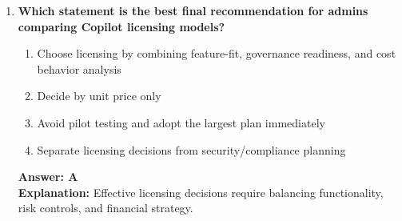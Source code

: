 \documentclass[10pt]{article}
\begin{document}
\begin{enumerate}[leftmargin=*]
\item \textbf{Which statement is the best final recommendation for admins comparing Copilot licensing models?}
\begin{enumerate}[label=\Alph*.]
  \item Choose licensing by combining feature-fit, governance readiness, and cost behavior analysis
  \item Decide by unit price only
  \item Avoid pilot testing and adopt the largest plan immediately
  \item Separate licensing decisions from security/compliance planning
\end{enumerate}
\textbf{Answer: A}\\
\textbf{Explanation:} Effective licensing decisions require balancing functionality, risk controls, and financial strategy.

\end{enumerate}


\clearpage
\end{document}
